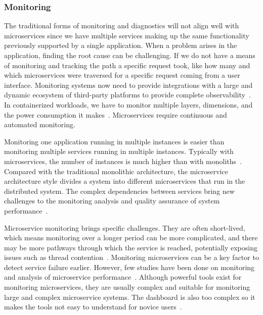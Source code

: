 \subsubsection{Monitoring}%


The traditional forms of monitoring and diagnostics will not align well with microservices since we have multiple services making up the same functionality previously supported by a single application. 
When a problem arises in the application, finding the root cause can be challenging. If we do not have a means of monitoring and tracking the path a specific request took, like how many and which microservices were traversed for a specific request coming from a user interface. Monitoring systems now need to provide integrations with a large and dynamic ecosystem of third-party platforms to provide complete observability~\cite{Netflix}. In containerized workloads, we have to monitor multiple layers, dimensions, and the power consumption it makes~\cite{Kristiani2020}. Microservices require continuous and automated monitoring. 

\par Monitoring one application running in multiple instances is easier than monitoring multiple services running in multiple instances. Typically with microservices, the number of instances is much higher than with monoliths~\cite{Kalske2017}. Compared with the traditional monolithic architecture, the microservice architecture style divides a system into different microservices that run in the distributed system. The complex dependencies between services bring new challenges to the monitoring analysis and quality assurance of system performance~\cite{Zhihui2020, Venugopal2017}. 

\par Microservice monitoring brings specific challenges. They are often short-lived, which means monitoring over a longer period can be more complicated, and there may be more pathways through which the service is reached, potentially exposing issues such as thread contention~\cite{Zhang2019}. Monitoring microservices can be a key factor to detect service failure earlier. However, few studies have been done on monitoring and analysis of microservice performance~\cite{Saman2017, Monterio2018}. Although powerful tools exist for monitoring microservices, they are usually complex and suitable for monitoring large and complex microservice systems. 
The dashboard is also too complex so it makes the tools not easy to understand for novice users~\cite{Utomo2020}. 

